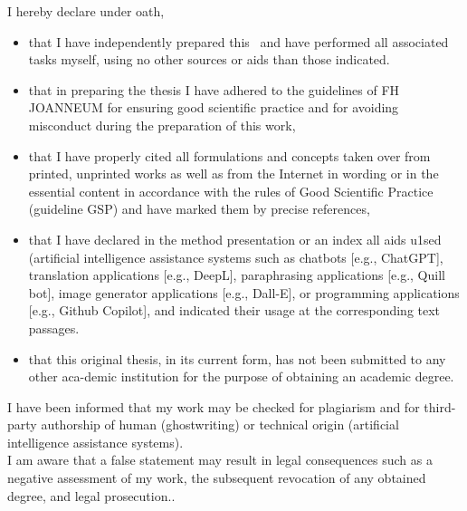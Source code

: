 %


	\thispagestyle{empty}
	
	{\hfill\fontfamily{\sfdefault}\bfseries\fontsize{22}{22}\selectfont{Declaration of Honour}}\vspace*{1cm}
	
	\noindent I hereby declare under oath,
	
	\begin{itemize}
		\item {that I have independently prepared this \DocTypeText~and have performed all associated tasks myself, using no other sources or aids than those indicated.}
		\item {that in preparing the thesis I have adhered to the guidelines of FH JOANNEUM for ensuring good scientific practice and for avoiding misconduct during the preparation of this work,}
		\item {that I have properly cited all formulations and concepts taken over from printed, unprinted works as well as from the Internet in wording or in the essential content in accordance with the rules of Good Scientific Practice (guideline GSP) and have marked them by precise references,}
		\item {that I have declared in the method presentation or an index all aids u1sed (artificial intelligence assistance systems such as chatbots [e.g., ChatGPT], translation applications [e.g., DeepL], paraphrasing applications [e.g., Quill bot], image generator applications [e.g., Dall-E], or programming applications [e.g., Github Copilot], and indicated their usage at the corresponding text passages.}
		\item {that this original thesis, in its current form, has not been submitted to any other aca-demic institution for the purpose of obtaining an academic degree.}
	\end{itemize}
	
	\noindent I have been informed that my work may be checked for plagiarism and for third-party authorship of human (ghostwriting) or technical origin (artificial intelligence assistance systems).\\
	
	\noindent I am aware that a false statement may result in legal consequences such as a negative assessment of my work, the subsequent revocation of any obtained degree, and legal prosecution..
	
	
	\ifthenelse{\equal{\Style}{\Book}}
	{
		\newpage\null\thispagestyle{empty}\newpage
	}
	{
	}
	
